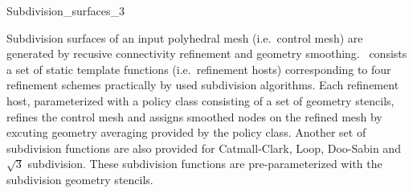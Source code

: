 
\ccRefPageBegin



\begin{ccRefClass}{Subdivision_surfaces_3}

\ccDefinition

Subdivision surfaces of an input polyhedral mesh (i.e.~control mesh)
are generated by recusive connectivity refinement and geometry
smoothing. \ccClassTemplateName\ consists a set of static 
template functions (i.e.~refinement hosts) corresponding 
to four refinement schemes practically by used subdivision algorithms. 
Each refinement host, parameterized with a policy class
consisting of a set of geometry stencils, refines the
control mesh and assigns smoothed nodes on the refined mesh
by excuting geometry averaging provided by the policy class.
Another set of subdivision functions are also provided  
for Catmall-Clark, Loop, Doo-Sabin and $\sqrt{3}$ subdivision.
These subdivision functions are pre-parameterized with the
subdivision geometry stencils.





\end{ccRefClass}
